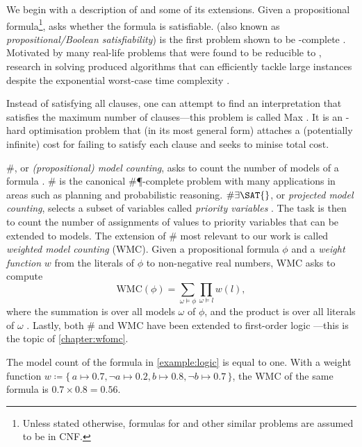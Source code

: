 We begin with a description of \SAT{} and some of its extensions. Given a propositional formula\footnote{Unless stated otherwise, formulas for \SAT{} and other similar problems are assumed to be in CNF.}, \SAT{} asks whether the formula is satisfiable. \SAT{} (also known as \emph{propositional/Boolean satisfiability}) is the first problem shown to be \NP-complete \citep{DBLP:conf/stoc/Cook71,levin1973universal}. Motivated by many real-life problems that were found to be reducible to \SAT{}, research in \SAT{} solving produced algorithms that can efficiently tackle large instances despite the exponential worst-case time complexity \citep{DBLP:series/faia/2009-185}.

Instead of satisfying all clauses, one can attempt to find an interpretation that satisfies the maximum number of clauses---this problem is called Max\SAT{} \citep{bacchus2021maximum,DBLP:series/faia/LiM09}. It is an \NP-hard optimisation problem that (in its most general form) attaches a (potentially infinite) cost for failing to satisfy each clause and seeks to minise total cost.

\#\SAT{}, or \emph{(propositional) model counting}, asks to count the number of models of a formula \citep{DBLP:series/faia/GomesSS09}. \#\SAT{} is the canonical \#\P-complete problem with many applications in areas such as planning and probabilistic reasoning. $\#\exists\SAT{}$, or \emph{projected model counting}, selects a subset of variables called \emph{priority variables} \citep{DBLP:conf/sat/AzizCMS15}. The task is then to count the number of assignments of values to priority variables that can be extended to models. The extension of \#\SAT{} most relevant to our work is called \emph{weighted model counting} (WMC). Given a propositional formula $\phi$ and a \emph{weight function} $w$ from the literals of $\phi$ to non-negative real numbers, WMC asks to compute
\[
\mathrm{WMC}(\phi) = \sum_{\omega \models \phi} \prod_{\omega \models l} w(l),
\]
where the summation is over all models $\omega$ of $\phi$, and the product is over all literals of $\omega$ \citep{DBLP:journals/ai/ChaviraD08}. Lastly, both \#\SAT{} and WMC have been extended to first-order logic \citep{DBLP:conf/ijcai/BroeckTMDR11}---this is the topic of \cref{chapter:wfomc}.

\begin{example} \label{example:wmc1}
  The model count of the formula in \cref{example:logic} is equal to one. With a weight function $w \coloneqq \{\, a \mapsto 0.7, \neg a \mapsto 0.2, b \mapsto 0.8, \neg b \mapsto 0.7 \,\}$, the WMC of the same formula is $0.7 \times 0.8 = 0.56$.
\end{example}

